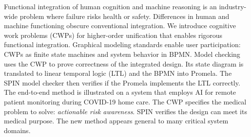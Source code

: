 Functional integration of human cognition and machine reasoning is an industry-wide problem where failure risks health or safety.
Differences in human and machine functioning obscure conventional integration. 
We introduce cognitive work problems (CWPs) for higher-order unification that enables rigorous functional integration. 
Graphical modeling standards enable user participation: CWPs as finite state machines and system behavior in BPMN. 
Model checking uses the CWP to prove correctness of the integrated design. 
Its state diagram is translated to linear temporal logic (LTL) and the BPMN into Promela. 
The SPIN model checker then verifies if the Promela implements the LTL correctly. 
The end-to-end method is illustrated on a system that employs AI for remote patient monitoring during COVID-19 home care. 
The CWP specifies the medical problem to solve: \emph{actionable risk awareness}.
SPIN verifies the design can meet its medical purpose. %
The new method appears general to many critical system domains.